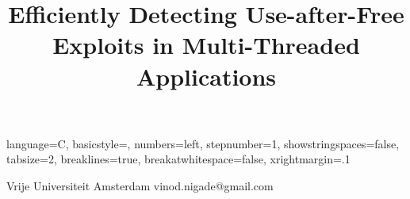 \documentclass[preprint,10pt,numbers]{sigplanconf}
\begin{document}
\setlength{\pdfpageheight}{\paperheight}
\setlength{\pdfpagewidth}{\paperwidth}


\newcommand{\projectname}[0]{DangSan}
\newcommand{\freesentry}[0]{FreeSentry}
\newcommand{\dangnull}[0]{DangNull}
\newcommand{\metalloc}[0]{METAlloc} %

\newcommand{\tablecell}[1]{\bfseries \begin{tabular}{@{}l@{}} #1 \end{tabular}}

\lstset
{ %
    language=C,
    basicstyle=\footnotesize,
    numbers=left,
    stepnumber=1,
    showstringspaces=false,
    tabsize=2,
    breaklines=true,
    breakatwhitespace=false,
    xrightmargin=.1\textwidth
}



\title{Efficiently Detecting Use-after-Free Exploits in Multi-Threaded Applications}
           {Vrije Universiteit Amsterdam}
           {vinod.nigade@gmail.com}

\maketitle








%
















\end{document}
